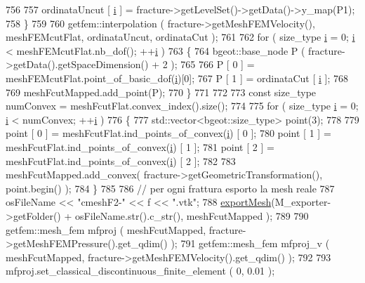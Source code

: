 \begin{DoxyCode}
756 
757             ordinataUncut [ \hyperlink{matrici_8m_a6f6ccfcf58b31cb6412107d9d5281426}{i} ] = fracture->getLevelSet()->getData()->y\_map(P1);
758         \}
759 
760         getfem::interpolation ( fracture->getMeshFEMVelocity(), meshFEMcutFlat, ordinataUncut, ordinataCut 
      );
761 
762         \textcolor{keywordflow}{for} ( size\_type \hyperlink{matrici_8m_a6f6ccfcf58b31cb6412107d9d5281426}{i} = 0; \hyperlink{matrici_8m_a6f6ccfcf58b31cb6412107d9d5281426}{i} < meshFEMcutFlat.nb\_dof(); ++\hyperlink{matrici_8m_a6f6ccfcf58b31cb6412107d9d5281426}{i} )
763         \{
764             bgeot::base\_node P ( fracture->getData().getSpaceDimension() + 2 );
765             
766             P [ 0 ] = meshFEMcutFlat.point\_of\_basic\_dof(\hyperlink{matrici_8m_a6f6ccfcf58b31cb6412107d9d5281426}{i})[0];
767             P [ 1 ] = ordinataCut [ \hyperlink{matrici_8m_a6f6ccfcf58b31cb6412107d9d5281426}{i} ];
768             
769             meshFcutMapped.add\_point(P);
770         \}
771 
772 
773         \textcolor{keyword}{const} size\_type numConvex = meshFcutFlat.convex\_index().size();
774 
775         \textcolor{keywordflow}{for} ( size\_type \hyperlink{matrici_8m_a6f6ccfcf58b31cb6412107d9d5281426}{i} = 0; \hyperlink{matrici_8m_a6f6ccfcf58b31cb6412107d9d5281426}{i} < numConvex; ++\hyperlink{matrici_8m_a6f6ccfcf58b31cb6412107d9d5281426}{i} )
776         \{
777             std::vector<bgeot::size\_type> point(3);
778            
779             point [ 0 ] = meshFcutFlat.ind\_points\_of\_convex(\hyperlink{matrici_8m_a6f6ccfcf58b31cb6412107d9d5281426}{i}) [ 0 ];
780             point [ 1 ] = meshFcutFlat.ind\_points\_of\_convex(\hyperlink{matrici_8m_a6f6ccfcf58b31cb6412107d9d5281426}{i}) [ 1 ];
781             point [ 2 ] = meshFcutFlat.ind\_points\_of\_convex(\hyperlink{matrici_8m_a6f6ccfcf58b31cb6412107d9d5281426}{i}) [ 2 ];
782             
783             meshFcutMapped.add\_convex( fracture->getGeometricTransformation(), point.begin() );
784         \}
785 
786         \textcolor{comment}{// per ogni frattura esporto la mesh reale}
787         osFileName << \textcolor{stringliteral}{"cmeshF2-"} << f << \textcolor{stringliteral}{".vtk"};
788         \hyperlink{UsefulFunctions_8h_ae4bd400c144e72bee180107bb41ae72a}{exportMesh}(M\_exporter->getFolder() + osFileName.str().c\_str(), meshFcutMapped );
789 
790         getfem::mesh\_fem mfproj ( meshFcutMapped, fracture->getMeshFEMPressure().get\_qdim() );
791         getfem::mesh\_fem mfproj\_v ( meshFcutMapped, fracture->getMeshFEMVelocity().get\_qdim() );
792 
793         mfproj.set\_classical\_discontinuous\_finite\_element ( 0, 0.01 );

\end{DoxyCode}
